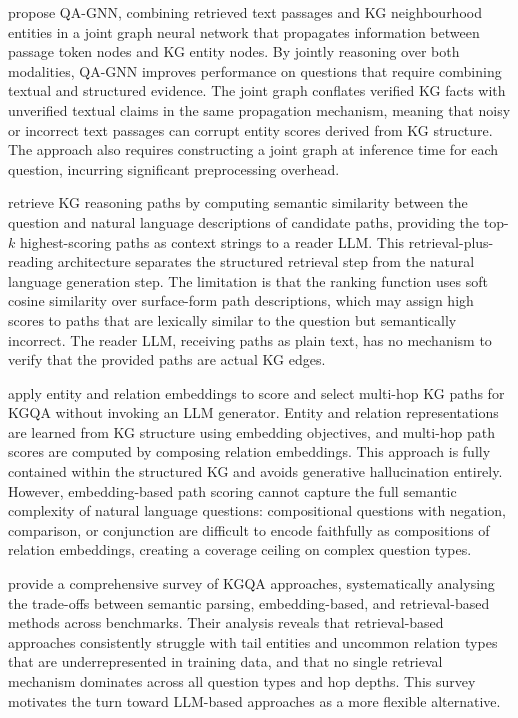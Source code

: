 \citet{yasunaga2021qagnn} propose QA-GNN, combining retrieved text passages and KG neighbourhood entities in a joint graph neural network that propagates information between passage token nodes and KG entity nodes. By jointly reasoning over both modalities, QA-GNN improves performance on questions that require combining textual and structured evidence. The joint graph conflates verified KG facts with unverified textual claims in the same propagation mechanism, meaning that noisy or incorrect text passages can corrupt entity scores derived from KG structure. The approach also requires constructing a joint graph at inference time for each question, incurring significant preprocessing overhead.

\citet{shi2021kgpath} retrieve KG reasoning paths by computing semantic similarity between the question and natural language descriptions of candidate paths, providing the top-$k$ highest-scoring paths as context strings to a reader LLM. This retrieval-plus-reading architecture separates the structured retrieval step from the natural language generation step. The limitation is that the ranking function uses soft cosine similarity over surface-form path descriptions, which may assign high scores to paths that are lexically similar to the question but semantically incorrect. The reader LLM, receiving paths as plain text, has no mechanism to verify that the provided paths are actual KG edges.

\citet{saxena2022kgqa} apply entity and relation embeddings to score and select multi-hop KG paths for KGQA without invoking an LLM generator. Entity and relation representations are learned from KG structure using embedding objectives, and multi-hop path scores are computed by composing relation embeddings. This approach is fully contained within the structured KG and avoids generative hallucination entirely. However, embedding-based path scoring cannot capture the full semantic complexity of natural language questions: compositional questions with negation, comparison, or conjunction are difficult to encode faithfully as compositions of relation embeddings, creating a coverage ceiling on complex question types.

\citet{lan2022kgqa} provide a comprehensive survey of KGQA approaches, systematically analysing the trade-offs between semantic parsing, embedding-based, and retrieval-based methods across benchmarks. Their analysis reveals that retrieval-based approaches consistently struggle with tail entities and uncommon relation types that are underrepresented in training data, and that no single retrieval mechanism dominates across all question types and hop depths. This survey motivates the turn toward LLM-based approaches as a more flexible alternative.


